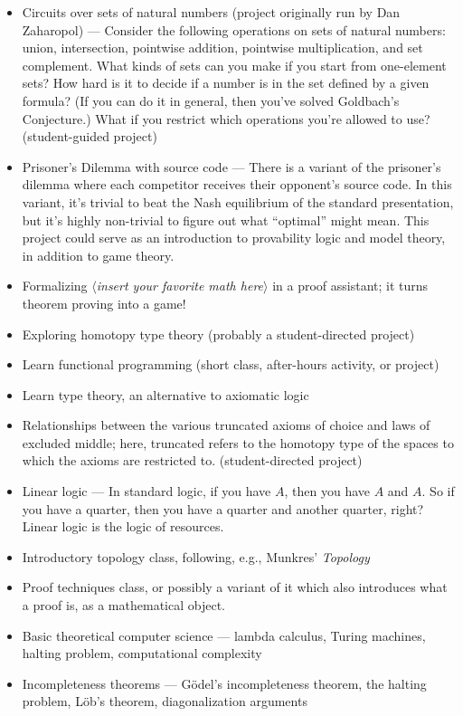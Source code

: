 \documentclass{article}
\begin{document}
\begin{itemize}
  \item Circuits over sets of natural numbers (project originally run by Dan Zaharopol) --- Consider the following operations on sets of natural numbers: union, intersection, pointwise addition, pointwise multiplication, and set complement.  What kinds of sets can you make if you start from one-element sets?  How hard is it to decide if a number is in the set defined by a given formula?  (If you can do it in general, then you've solved Goldbach's Conjecture.)  What if you restrict which operations you're allowed to use?  (student-guided project)
  \item Prisoner's Dilemma with source code --- There is a variant of the prisoner's dilemma where each competitor receives their opponent's source code.  In this variant, it's trivial to beat the Nash equilibrium of the standard presentation, but it's highly non-trivial to figure out what ``optimal'' might mean.  This project could serve as an introduction to provability logic and model theory, in addition to game theory.
  \item Formalizing $\langle$\emph{insert your favorite math here}$\rangle$ in a proof assistant; it turns theorem proving into a game!
  \item Exploring homotopy type theory (probably a student-directed project)
  \item Learn functional programming (short class, after-hours activity, or project)
  \item Learn type theory, an alternative to axiomatic logic
  \item Relationships between the various truncated axioms of choice and laws of excluded middle; here, truncated refers to the homotopy type of the spaces to which the axioms are restricted to. (student-directed project)
  \item Linear logic --- In standard logic, if you have $A$, then you have $A$ and $A$.  So if you have a quarter, then you have a quarter and another quarter, right?  Linear logic is the logic of resources.
  \item Introductory topology class, following, e.g., Munkres' \emph{Topology}
  \item Proof techniques class, or possibly a variant of it which also introduces what a proof is, as a mathematical object.
  \item Basic theoretical computer science --- lambda calculus, Turing machines, halting problem, computational complexity
  \item Incompleteness theorems --- G\"odel's incompleteness theorem, the halting problem, L\"ob's theorem, diagonalization arguments
\end{itemize}
\end{document}
